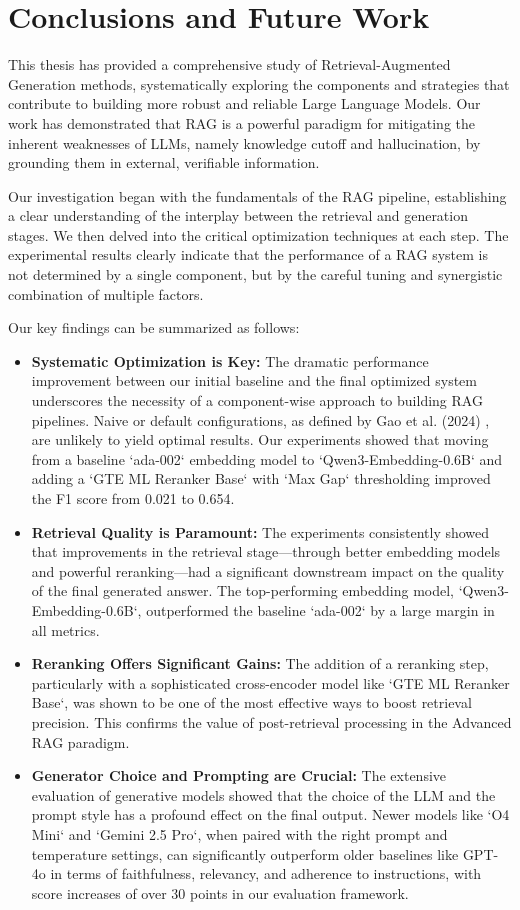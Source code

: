 \chapter{Conclusions and Future Work}
\label{chap:conclusions}

This thesis has provided a comprehensive study of Retrieval-Augmented Generation methods, systematically exploring the components and strategies that contribute to building more robust and reliable Large Language Models. Our work has demonstrated that RAG is a powerful paradigm for mitigating the inherent weaknesses of LLMs, namely knowledge cutoff and hallucination, by grounding them in external, verifiable information.

Our investigation began with the fundamentals of the RAG pipeline, establishing a clear understanding of the interplay between the retrieval and generation stages. We then delved into the critical optimization techniques at each step. The experimental results clearly indicate that the performance of a RAG system is not determined by a single component, but by the careful tuning and synergistic combination of multiple factors. 

Our key findings can be summarized as follows:
\begin{itemize}
    \item \textbf{Systematic Optimization is Key:} The dramatic performance improvement between our initial baseline and the final optimized system underscores the necessity of a component-wise approach to building RAG pipelines. Naive or default configurations, as defined by Gao et al. (2024) \autocite{gao2024retrievalaugmented}, are unlikely to yield optimal results. Our experiments showed that moving from a baseline `ada-002` embedding model to `Qwen3-Embedding-0.6B` and adding a `GTE ML Reranker Base` with `Max Gap` thresholding improved the F1 score from 0.021 to 0.654.
    \item \textbf{Retrieval Quality is Paramount:} The experiments consistently showed that improvements in the retrieval stage—through better embedding models and powerful reranking—had a significant downstream impact on the quality of the final generated answer. The top-performing embedding model, `Qwen3-Embedding-0.6B`, outperformed the baseline `ada-002` by a large margin in all metrics.
    \item \textbf{Reranking Offers Significant Gains:} The addition of a reranking step, particularly with a sophisticated cross-encoder model like `GTE ML Reranker Base`, was shown to be one of the most effective ways to boost retrieval precision. This confirms the value of post-retrieval processing in the Advanced RAG paradigm.
    \item \textbf{Generator Choice and Prompting are Crucial:} The extensive evaluation of generative models showed that the choice of the LLM and the prompt style has a profound effect on the final output. Newer models like `O4 Mini` and `Gemini 2.5 Pro`, when paired with the right prompt and temperature settings, can significantly outperform older baselines like GPT-4o in terms of faithfulness, relevancy, and adherence to instructions, with score increases of over 30 points in our evaluation framework.
\end{itemize}

